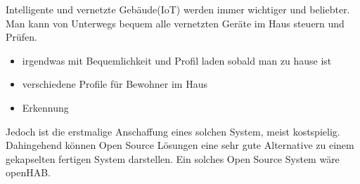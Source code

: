 Intelligente und vernetzte Gebäude(IoT) werden immer wichtiger und beliebter.
Man kann von Unterwegs bequem alle vernetzten Geräte im Haus steuern und Prüfen.
\begin{itemize}
      \item irgendwas mit Bequemlichkeit und Profil laden sobald man zu hause ist
      \item verschiedene Profile für Bewohner im Haus
			\item Erkennung
\end{itemize}

Jedoch ist die erstmalige Anschaffung eines solchen System, meist kostspielig.
Dahingehend können Open Source Lösungen eine sehr gute Alternative zu einem gekapselten fertigen System darstellen.
Ein solches Open Source System wäre openHAB.